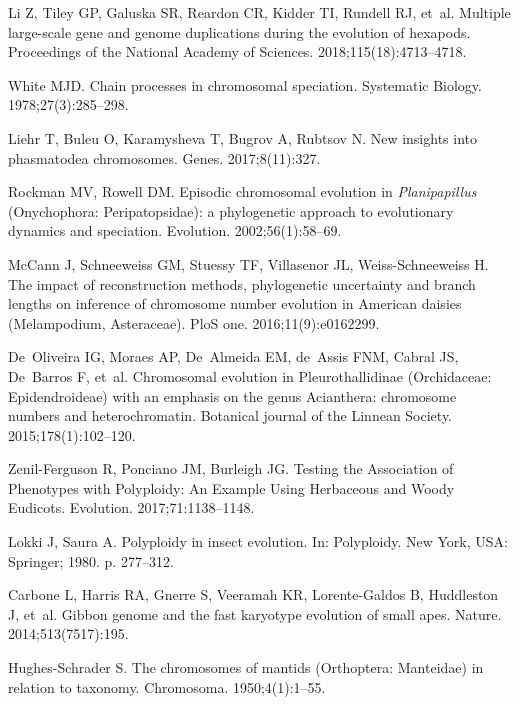 \documentclass[]{rsos}%
\begin{document}
\begin{thebibliography}{99}
Li Z, Tiley GP, Galuska SR, Reardon CR, Kidder TI, Rundell RJ, et~al.
Multiple large-scale gene and genome duplications during the evolution of hexapods.
Proceedings of the National Academy of Sciences.
2018;115(18):4713--4718.


White MJD.
 Chain processes in chromosomal speciation.
 Systematic Biology. 1978;27(3):285--298.
 
Liehr T, Buleu O, Karamysheva T, Bugrov A, Rubtsov N.
 New insights into phasmatodea chromosomes.
Genes. 2017;8(11):327.

Rockman MV, Rowell DM.
 Episodic chromosomal evolution in \emph{{P}lanipapillus}
  ({O}nychophora: {P}eripatopsidae): a phylogenetic approach to evolutionary
  dynamics and speciation.
 Evolution. 2002;56(1):58--69.

McCann J, Schneeweiss GM, Stuessy TF, Villasenor JL, Weiss-Schneeweiss H.
 The impact of reconstruction methods, phylogenetic uncertainty and
  branch lengths on inference of chromosome number evolution in American
  daisies (Melampodium, Asteraceae).
 PloS one. 2016;11(9):e0162299.

De~Oliveira IG, Moraes AP, De~Almeida EM, de~Assis FNM, Cabral JS, De~Barros F,
  et~al.
 Chromosomal evolution in Pleurothallidinae (Orchidaceae:
  Epidendroideae) with an emphasis on the genus Acianthera: chromosome numbers
  and heterochromatin.
 Botanical journal of the Linnean Society. 2015;178(1):102--120.

Zenil-Ferguson R, Ponciano JM, Burleigh JG.
 Testing the Association of Phenotypes with Polyploidy: An Example
  Using Herbaceous and Woody Eudicots.
 Evolution. 2017;71:1138--1148.

Lokki J, Saura A.
 Polyploidy in insect evolution.
 In: Polyploidy. New York, USA: Springer; 1980. p. 277--312.

Carbone L, Harris RA, Gnerre S, Veeramah KR, Lorente-Galdos B, Huddleston J,
  et~al.
 Gibbon genome and the fast karyotype evolution of small apes.
 Nature. 2014;513(7517):195.

Hughes-Schrader S.
 The chromosomes of mantids (Orthoptera: Manteidae) in relation to
  taxonomy.
 Chromosoma. 1950;4(1):1--55.
 

\end{thebibliography}
\end{document}
